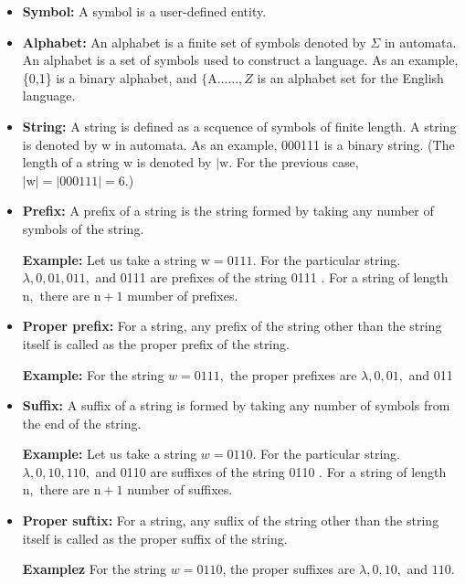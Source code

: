 \documentclass [10pt,a4paper]{book}
\begin{document}
\begin{itemize}
\item

\textbf{Symbol:} A symbol is a user-defined entity.
\item

\textbf{Alphabet:} An alphabet is a finite set of symbols denoted by $\Sigma$ in automata. An alphabet is a set of symbols used to construct a language. As an example, \{0,1\} is a binary alphabet, and $\{\mathrm{A} \ldots \ldots, Z$ is an alphabet set for the English language.
\item

\textbf{String:} A string is defined as a scquence of symbols of finite length. A string is denoted by w in automata. As an example, 000111 is a binary string. (The length of a string w is denoted by $\mid \mathrm{w}$. For the previous case, $|\mathrm{w}|=|000111|=6$.)

\item
\textbf{Prefix:} A prefix of a string is the string formed by taking any number of symbols of the string.

\textbf{Example:} Let us take a string $\mathrm{w}=0111$. For the particular string. $\lambda, 0,01,011,$ and 0111 are prefixes of the string 0111 . For a string of length $\mathrm{n},$ there are $\mathrm{n}+1$ mumber of prefixes.

\item

\textbf{Proper prefix:} For a string, any prefix of the string other than the string itself is called as the proper prefix of the string.

\textbf{Example:} For the string $w=0111,$ the proper prefixes are $\lambda, 0,01,$ and 011

\item

\textbf{Suffix:} A suffix of a string is formed by taking any number of symbols from the end of the string.

\textbf{Example:} Let us take a string $w=0110$. For the particular string. $\lambda, 0,10,110,$ and 0110 are suffixes of the string 0110 . For a string of length $\mathrm{n},$ there are $\mathrm{n}+1$ number of suffixes.

\item

\textbf{Proper suftix:} For a string, any suflix of the string other than the string itself is called as the proper suffix of the string.

\textbf{Examplez} For the string $w=0110$, the proper suffixes are $\lambda, 0,10,$ and $110 .$


\end{itemize}
\end{document}
